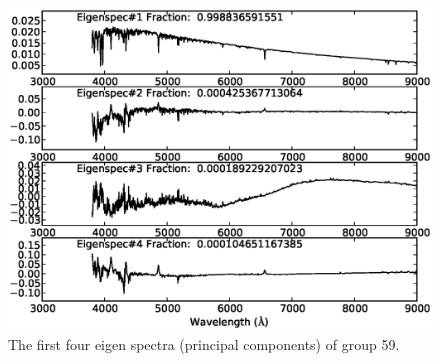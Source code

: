 \documentclass[manuscript]{aastex}
\begin{document}
\begin{figure}
   \centering
   \includegraphics[width=14cm, angle=0,clip]{f71.eps}
   \caption{The first four eigen spectra (principal components) of group 59.
   }
   \label{Fig71}
\end{figure}
\end{document}

